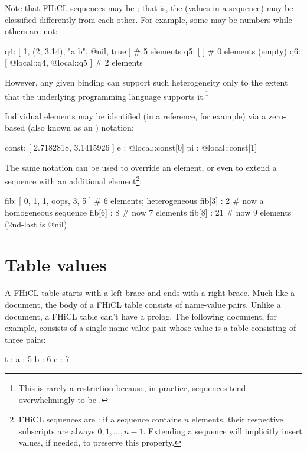 \documentclass[draftmode,draftwater]{memarticle}
\newcommand{\fhicl}%
 {FHiCL\xspace}
\begin{document}
Note that \fhicl sequences may be ; that is, the
 (values in a sequence) may be classified differently
from each other.  For example, some may be numbers while others are
not: 
%
\Needspace{0.50in}
\begin{fcllisting}[texcl,escapechar=`]
q4: [ 1, (2, 3.14), "a b", @nil, true ]  # 5 elements
q5: [ ]                                 # 0 elements (empty)
q6: [ @local::q4, @local::q5 ]          # 2 elements
\end{fcllisting}
However, any given binding can support such heterogeneity only to the
extent that the underlying programming language supports
it.\footnote{%
  This is rarely a restriction because, in practice, sequences tend
  overwhelmingly to be .%
}

Individual elements may be identified (in a reference, for example)
via a zero-based  (also known as an )
notation:
%
\Needspace{0.50in}
\begin{fcllisting}[texcl,escapechar=`]
const: [ 2.7182818, 3.1415926 ]
e    : @local::const[0]
pi   : @local::const[1]
\end{fcllisting}
The same notation can be used to override an element, or even to
extend a sequence with an additional element\footnote{%
  \fhicl sequences are : if a sequence contains $n$
  elements, their respective subscripts are always $0, 1, \ldots,
  n-1$.  Extending a sequence will implicitly insert  values, if
  needed, to preserve this property.  }: 
%
\Needspace{0.50in}
\begin{fcllisting}[texcl,escapechar=`]
fib: [ 0, 1, 1, oops, 3, 5 ]  # 6 elements; heterogeneous
fib[3] : 2                    # now a homogeneous sequence
fib[6] : 8                    # now 7 elements
fib[8] : 21                   # now 9 elements (2nd-last is @nil)
\end{fcllisting}

\section{Table values}

A \fhicl table starts with a left brace and ends with a right brace.
Much like a document, the body of a \fhicl table consists of
name-value pairs.  Unlike a document, a \fhicl table can't have a
prolog.  The following document, for example, consists of a single
name-value pair whose value is a table consisting of three pairs:
%
\Needspace{0.67in}
\begin{fcllisting}[texcl,escapechar=`]
t : {  a : 5
       b : 6
       c : 7
    }
\end{fcllisting}
\end{document}
